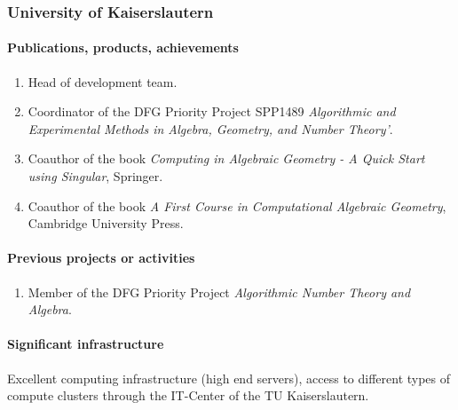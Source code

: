 \subsubsection{University of Kaiserslautern}




\paragraph{Publications, products, achievements}

\begin{enumerate}
\item Head of {} development team.
\item Coordinator of the DFG Priority Project SPP1489 \emph{Algorithmic and Experimental Methods in Algebra, Geometry, and
Number Theory'}.
\item Coauthor of the book \emph{Computing in Algebraic Geometry - A Quick Start using Singular}, Springer.
\item Coauthor of the book \emph{A First Course in Computational Algebraic Geometry}, 
Cambridge University Press.
\end{enumerate}

\paragraph{Previous projects or activities}

\begin{enumerate}
\item Member of the DFG Priority Project \emph{Algorithmic Number Theory and Algebra}.
\end{enumerate}

\paragraph{Significant infrastructure}

Excellent computing infrastructure (high end servers), access to 
different types of compute clusters through the IT-Center of the 
TU Kaiserslautern.


